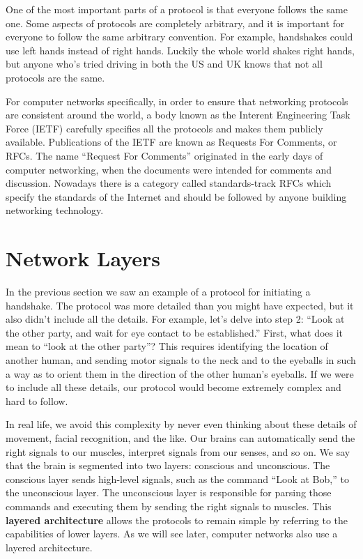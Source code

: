 One of the most important parts of a protocol is that everyone follows the same one. Some aspects of protocols are completely arbitrary, and it is important for everyone to follow the same arbitrary convention. For example, handshakes could use left hands instead of right hands. Luckily the whole world shakes right hands, but anyone who's tried driving in both the US and UK knows that not all protocols are the same.

For computer networks specifically, in order to ensure that networking protocols are consistent around the world, a body known as the Interent Engineering Task Force (IETF) carefully specifies all the protocols and makes them publicly available. Publications of the IETF are known as Requests For Comments, or RFCs. The name ``Request For Comments'' originated in the early days of computer networking, when the documents were intended for comments and discussion. Nowadays there is a category called standards-track RFCs which specify the standards of the Internet and should be followed by anyone building networking technology.

\section{Network Layers}\label{sec:network:layers}

In the previous section we saw an example of a protocol for initiating a handshake. The protocol was more detailed than you might have expected, but it also didn't include all the details. For example, let's delve into step 2: ``Look at the other party, and wait for eye contact to be established.'' First, what does it mean to ``look at the other party''? This requires identifying the location of another human, and sending motor signals to the neck and to the eyeballs in such a way as to orient them in the direction of the other human's eyeballs. If we were to include all these details, our protocol would become extremely complex and hard to follow.

In real life, we avoid this complexity by never even thinking about these details of movement, facial recognition, and the like. Our brains can automatically send the right signals to our muscles, interpret signals from our senses, and so on. We say that the brain is segmented into two layers: conscious and unconscious. The conscious layer sends high-level signals, such as the command ``Look at Bob,'' to the unconscious layer. The unconscious layer is responsible for parsing those commands and executing them by sending the right signals to muscles. This \textbf{layered architecture} allows the protocols to remain simple by referring to the capabilities of lower layers. As we will see later, computer networks also use a layered architecture.

